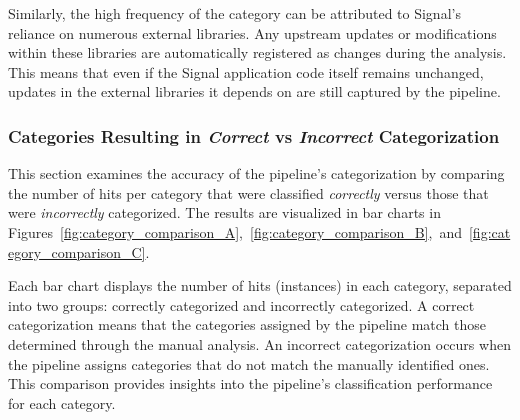 Similarly, the high frequency of the  category can be attributed to Signal’s reliance on numerous external libraries. Any upstream updates or modifications within these libraries are automatically registered as changes during the analysis. This means that even if the Signal application code itself remains unchanged, updates in the external libraries it depends on are still captured by the pipeline.

\subsubsection{Categories Resulting in \textit{Correct} vs \textit{Incorrect} Categorization}
\label{sec:result:categorization_distributions:categories_resulting_in_correct_incorrect_categorizations}

This section examines the accuracy of the pipeline’s categorization by comparing the number of hits per category that were classified \textit{correctly} versus those that were \textit{incorrectly} categorized. The results are visualized in bar charts in Figures~\ref{fig:category_comparison_A},~\ref{fig:category_comparison_B},~and~\ref{fig:category_comparison_C}. 

Each bar chart displays the number of hits (instances) in each category, separated into two groups: correctly categorized and incorrectly categorized. A correct categorization means that the categories assigned by the pipeline match those determined through the manual analysis. An incorrect categorization occurs when the pipeline assigns categories that do not match the manually identified ones. This comparison provides insights into the pipeline’s classification performance for each category.


